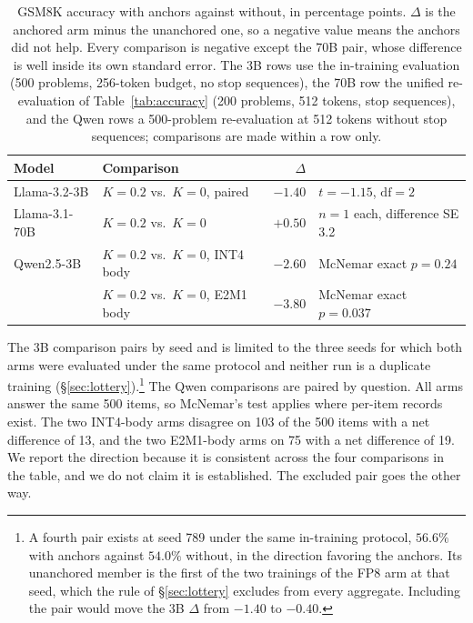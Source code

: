 \documentclass[11pt,letterpaper]{article}
\begin{document}
\begin{table}[htbp]
\centering
\small
\caption{GSM8K accuracy with anchors against without, in percentage points. $\Delta$ is the anchored arm minus the unanchored one, so a negative value means the anchors did not help. Every comparison is negative except the 70B pair, whose difference is well inside its own standard error. The 3B rows use the in-training evaluation (500 problems, 256-token budget, no stop sequences), the 70B row the unified re-evaluation of Table~\ref{tab:accuracy} (200 problems, 512 tokens, stop sequences), and the Qwen rows a 500-problem re-evaluation at 512 tokens without stop sequences; comparisons are made within a row only.}
\label{tab:anchor_acc}
\begin{tabular}{llrl}
\toprule
Model & Comparison & $\Delta$ & \\
\midrule
Llama-3.2-3B & $K{=}0.2$ vs.\ $K{=}0$, paired & $-1.40$ & $t = -1.15$, $\mathrm{df} = 2$ \\
Llama-3.1-70B & $K{=}0.2$ vs.\ $K{=}0$ & $+0.50$ & $n{=}1$ each, difference SE 3.2 \\
Qwen2.5-3B & $K{=}0.2$ vs.\ $K{=}0$, INT4 body & $-2.60$ & McNemar exact $p = 0.24$ \\
 & $K{=}0.2$ vs.\ $K{=}0$, E2M1 body & $-3.80$ & McNemar exact $p = 0.037$ \\
\bottomrule
\end{tabular}
\end{table}

The 3B comparison pairs by seed and is limited to the three seeds for which both arms were evaluated under the same protocol and neither run is a duplicate training (\S\ref{sec:lottery}).\footnote{A fourth pair exists at seed 789 under the same in-training protocol, $56.6\%$ with anchors against $54.0\%$ without, in the direction favoring the anchors. Its unanchored member is the first of the two trainings of the FP8 arm at that seed, which the rule of \S\ref{sec:lottery} excludes from every aggregate. Including the pair would move the 3B $\Delta$ from $-1.40$ to $-0.40$.} The Qwen comparisons are paired by question. All arms answer the same 500 items, so McNemar's test applies where per-item records exist. The two INT4-body arms disagree on 103 of the 500 items with a net difference of 13, and the two E2M1-body arms on 75 with a net difference of 19. We report the direction because it is consistent across the four comparisons in the table, and we do not claim it is established. The excluded pair goes the other way.
\end{document}

